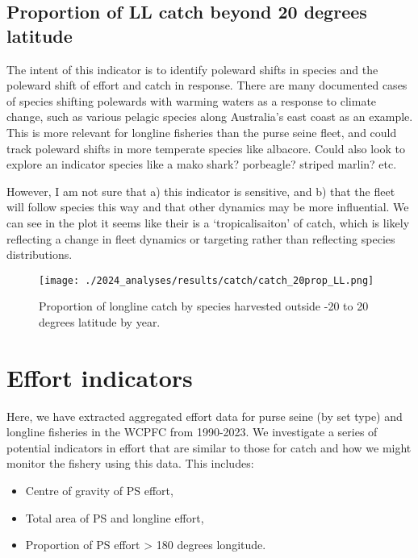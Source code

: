 \documentclass[
]{article}
\begin{document}
\clearpage

\hypertarget{proportion-of-ll-catch-beyond-20-degrees-latitude}{%
\subsection{Proportion of LL catch beyond 20 degrees
latitude}\label{proportion-of-ll-catch-beyond-20-degrees-latitude}}

The intent of this indicator is to identify poleward shifts in species
and the poleward shift of effort and catch in response. There are many
documented cases of species shifting polewards with warming waters as a
response to climate change, such as various pelagic species along
Australia's east coast as an example. This is more relevant for longline
fisheries than the purse seine fleet, and could track poleward shifts in
more temperate species like albacore. Could also look to explore an
indicator species like a mako shark? porbeagle? striped marlin? etc.

However, I am not sure that a) this indicator is sensitive, and b) that
the fleet will follow species this way and that other dynamics may be
more influential. We can see in the plot it seems like their is a
`tropicalisaiton' of catch, which is likely reflecting a change in fleet
dynamics or targeting rather than reflecting species distributions.

\begin{figure}
\centering
\texttt{[image: ./2024\_analyses/results/catch/catch\_20prop\_LL.png]}
\caption{Proportion of longline catch by species harvested outside -20
to 20 degrees latitude by year.}
\end{figure}

\clearpage

\hypertarget{effort-indicators}{%
\section{Effort indicators}\label{effort-indicators}}

Here, we have extracted aggregated effort data for purse seine (by set
type) and longline fisheries in the WCPFC from 1990-2023. We investigate
a series of potential indicators in effort that are similar to those for
catch and how we might monitor the fishery using this data. This
includes:

\begin{itemize}
\item
  Centre of gravity of PS effort,
\item
  Total area of PS and longline effort,
\item
  Proportion of PS effort \textgreater{} 180 degrees longitude.
\end{itemize}
\end{document}
